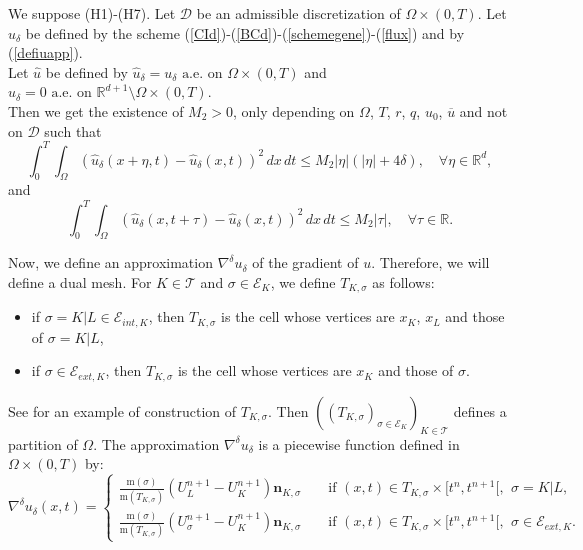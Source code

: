 \documentclass[smallextended]{svjour3}
\newcommand{\ds}{\displaystyle}
\begin{document}
\begin{lemma}
We suppose (H1)-(H7). Let $\mathcal{D}$ be an admissible discretization of $ \Omega \times (0,T)$. Let $u_{\delta}$ be defined by the scheme (\ref{CId})-(\ref{BCd})-(\ref{schemegene})-(\ref{flux}) and by (\ref{defiuapp}).\\
Let $ \hat{u}$ be defined by $\hat{u}_{\delta}=u_{\delta} \text{ a.e. on } \Omega \times (0,T)$ and $\hat{u}_{\delta}=0 \text{ a.e. on } \mathbb{R}^{d+1} \setminus \Omega \times (0,T)$.\\
Then we get the existence of $M_{2}>0$, only depending on $ \Omega$, $T$, $r$, $q$, $u_{0}$, $\overline{u}$ and not on $ \mathcal{D}$ such that 
\begin{equation}
\int_{0}^{T}\int_{\Omega}\left(\hat{u}_{\delta}(x+\eta,t)-\hat{u}_{\delta}(x,t)\right)^{2}\, dx\, dt \leq M_{2}|\eta|(|\eta|+4\delta), \quad \forall \eta \in \mathbb{R}^{d},
\label{transspace}
\end{equation}
and
\begin{equation}
\int_{0}^{T}\int_{\Omega}\left(\hat{u}_{\delta}(x,t+\tau)-\hat{u}_{\delta}(x,t)\right)^{2}\, dx \, dt \leq M_{2}|\tau|, \quad \forall \tau \in \mathbb{R}.
\label{transtime}
\end{equation}
\end{lemma}

Now, we define an approximation $\nabla^{\delta}u_{\delta}$ of the gradient of $u$. Therefore, we will define a dual mesh. For $K \in \mathcal{T}$ and $\sigma \in \mathcal{E}_{K}$, we define $T_{K,\sigma}$ as follows: 
\begin{itemize}
\item if $\sigma=K|L \in \mathcal{E}_{int,K}$, then $T_{K,\sigma}$ is the cell whose vertices are $x_{K}$, $x_{L}$ and those of $\sigma=K|L$,
\item if $\sigma \in \mathcal{E}_{ext,K}$, then $T_{K,\sigma}$ is the cell whose vertices are $x_{K}$ and those of $\sigma$.
\end{itemize}
See \cite{Chainais-Hillairet2004} for an example of construction of $T_{K,\sigma}$. Then $\left(\left(T_{K,\sigma}\right)_{\sigma \in \mathcal{E}_{K}}\right)_{K \in \mathcal{T}}$ defines a partition of $\Omega$.
The approximation $\nabla^{\delta}u_{\delta}$ is a piecewise function defined in $\Omega \times (0,T)$ by:
\begin{equation*}
\nabla^{\delta}u_{\delta}(x,t)=\left\{\begin{array}{lcl} \ds{\frac{\text{m}(\sigma)}{\text{m}(T_{K,\sigma})}\left(U^{n+1}_{L}-U^{n+1}_{K}\right) \mathbf{n}_{K,\sigma}} &  & \text{ if }  (x,t) \in T_{K,\sigma}\times [t^{n},t^{n+1}[, \,\ \sigma=K|L,\\ \ds{\frac{\text{m}(\sigma)}{\text{m}(T_{K,\sigma})}\left(U^{n+1}_{\sigma}-U^{n+1}_{K}\right) \mathbf{n}_{K,\sigma}} & & \text{ if } (x,t) \in T_{K,\sigma}\times [t^{n},t^{n+1}[, \,\ \sigma \in \mathcal{E}_{ext,K}. \end{array}\right.
\end{equation*}
\end{document}
